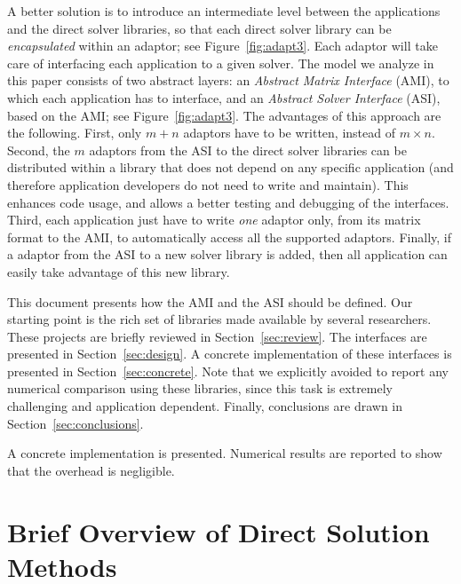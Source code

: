 \documentclass[acmtocl]{acmtrans2m}
\begin{document}
A better solution is to introduce an intermediate level between the
applications and the direct solver libraries, so that each direct solver
library can be {\sl encapsulated} within an adaptor; see
Figure~\ref{fig:adapt3}. Each adaptor will take
care of interfacing each application to a given solver. The model we analyze
in this paper consists of two abstract layers:
an {\sl Abstract Matrix Interface} (AMI), to which each application has to
interface, and an {\sl Abstract Solver Interface} (ASI), based on the AMI; see
Figure~\ref{fig:adapt3}. The advantages of this approach are the following.
First, only $m + n$ adaptors have to be written, instead of $m \times n$. 
Second, the $m$ adaptors from the ASI to the direct solver
libraries can be distributed within a library that does not depend on any
specific application (and therefore application developers do not need to
                      write and maintain). This enhances code usage, and
allows a better testing and debugging of the interfaces.
Third, each application just have to write {\sl one} adaptor
only, from its matrix format to the AMI, to automatically 
access all the supported adaptors.
Finally, if a adaptor from the ASI to a new
solver library is added, then all application can easily take advantage of this new
library.

\medskip

This document presents how the AMI and the ASI should be
defined.  Our starting point is the rich set of libraries made available by
several researchers. These projects are briefly reviewed in
Section~\ref{sec:review}.  The interfaces are presented in
Section~\ref{sec:design}. A concrete implementation of these interfaces is
presented in Section~\ref{sec:concrete}.  Note that we explicitly avoided to
report any numerical comparison using these libraries, since this task
is extremely challenging and application dependent. Finally,
  conclusions are drawn in Section~\ref{sec:conclusions}. 

A concrete implementation is presented. Numerical results
are reported to show that the overhead is negligible.

\section{Brief Overview of Direct Solution Methods}
\label{sec:theory}
\end{document}
